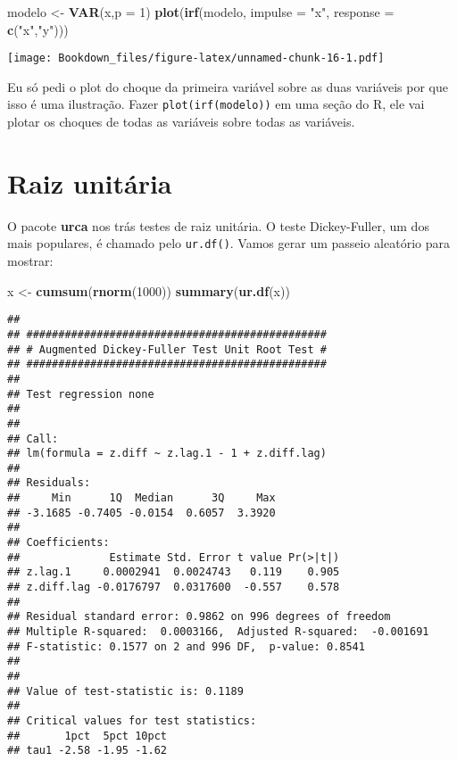 \documentclass[]{book}
\newenvironment{Shaded}{\begin{snugshade}}{\end{snugshade}}
\newcommand{\KeywordTok}[1]{\textcolor[rgb]{0.13,0.29,0.53}{\textbf{#1}}}
\newcommand{\DataTypeTok}[1]{\textcolor[rgb]{0.13,0.29,0.53}{#1}}
\newcommand{\DecValTok}[1]{\textcolor[rgb]{0.00,0.00,0.81}{#1}}
\newcommand{\StringTok}[1]{\textcolor[rgb]{0.31,0.60,0.02}{#1}}
\newcommand{\NormalTok}[1]{#1}
\begin{document}
\begin{Shaded}
\begin{Highlighting}[]
\NormalTok{modelo <-}\StringTok{ }\KeywordTok{VAR}\NormalTok{(x,}\DataTypeTok{p =} \DecValTok{1}\NormalTok{)}
\KeywordTok{plot}\NormalTok{(}\KeywordTok{irf}\NormalTok{(modelo, }\DataTypeTok{impulse =} \StringTok{"x"}\NormalTok{, }\DataTypeTok{response =} \KeywordTok{c}\NormalTok{(}\StringTok{"x"}\NormalTok{,}\StringTok{"y"}\NormalTok{)))}
\end{Highlighting}
\end{Shaded}

\texttt{[image: Bookdown\_files/figure-latex/unnamed-chunk-16-1.pdf]}

Eu só pedi o plot do choque da primeira variável sobre as duas variáveis
por que isso é uma ilustração. Fazer \texttt{plot(irf(modelo))} em uma
seção do R, ele vai plotar os choques de todas as variáveis sobre todas
as variáveis.

\section{Raiz unitária}\label{raiz-unitaria}

O pacote \textbf{urca} nos trás testes de raiz unitária. O teste
Dickey-Fuller, um dos mais populares, é chamado pelo \texttt{ur.df()}.
Vamos gerar um passeio aleatório para mostrar:

\begin{Shaded}
\begin{Highlighting}[]
\NormalTok{ x <-}\StringTok{ }\KeywordTok{cumsum}\NormalTok{(}\KeywordTok{rnorm}\NormalTok{(}\DecValTok{1000}\NormalTok{))}
\KeywordTok{summary}\NormalTok{(}\KeywordTok{ur.df}\NormalTok{(x))}
\end{Highlighting}
\end{Shaded}

\begin{verbatim}
## 
## ############################################### 
## # Augmented Dickey-Fuller Test Unit Root Test # 
## ############################################### 
## 
## Test regression none 
## 
## 
## Call:
## lm(formula = z.diff ~ z.lag.1 - 1 + z.diff.lag)
## 
## Residuals:
##     Min      1Q  Median      3Q     Max 
## -3.1685 -0.7405 -0.0154  0.6057  3.3920 
## 
## Coefficients:
##              Estimate Std. Error t value Pr(>|t|)
## z.lag.1     0.0002941  0.0024743   0.119    0.905
## z.diff.lag -0.0176797  0.0317600  -0.557    0.578
## 
## Residual standard error: 0.9862 on 996 degrees of freedom
## Multiple R-squared:  0.0003166,  Adjusted R-squared:  -0.001691 
## F-statistic: 0.1577 on 2 and 996 DF,  p-value: 0.8541
## 
## 
## Value of test-statistic is: 0.1189 
## 
## Critical values for test statistics: 
##       1pct  5pct 10pct
## tau1 -2.58 -1.95 -1.62
\end{verbatim}
\end{document}
